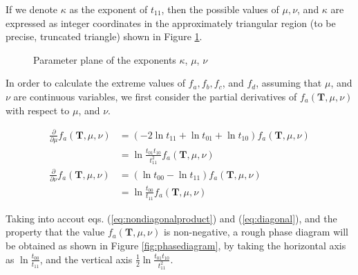 ﻿\documentclass[a4paper,xelatex,english]{bxjsarticle}
\newcommand\mib[1]{\boldsymbol{#1}}
\begin{document}
If we denote $\kappa$ as the exponent of $t_{11}$, then the possible values of $\mu, \nu$, and $\kappa$ are expressed as integer coordinates in the approximately triangular region (to be precise, truncated triangle) shown in Figure \ref{fig:parameterplane}.
\begin{figure}[htbp]
\centering


\caption{Parameter plane of the exponents $\kappa$, $\mu$, $\nu$}
\label{fig:parameterplane}
\end{figure}

In order to calculate the extreme values of $f_{a}, f_{b}, f_{c}$, and $f_{d}$, assuming that $\mu$, and $\nu$ are continuous variables, we first consider the partial derivatives of $f_{a}(\mib{T}, \mu, \nu)$ with respect to $\mu$, and $\nu$.

\begin{align}
	\frac{\partial }{\partial \mu} f_{a}(\mib{T}, \mu, \nu) 
	&= 
	(-2 \ln t_{11} + \ln t_{01} + \ln t_{10}) f_{a}(\mib{T}, \mu, \nu) 
	\nonumber \\
	&= 
	\ln \frac{t_{01} t_{10}}{t_{11}^{2}} 
	f_{a}(\mib{T}, \mu, \nu) 
	\label{eq:nondiagonalproduct}
	\\
	\frac{\partial }{\partial \nu} f_{a}(\mib{T}, \mu, \nu) 
	&= 
	(\ln t_{00} - \ln t_{11}) f_{a}(\mib{T}, \mu, \nu) 
	\nonumber \\
	&= 
	\ln \frac{t_{00}}{t_{11}} 
	f_{a}(\mib{T}, \mu, \nu) 
	\label{eq:diagonal}
\end{align}


Taking into accout eqs. (\ref{eq:nondiagonalproduct}) and (\ref{eq:diagonal}), and the property that the value $f_{a}(\mib{T}, \mu, \nu)$ is non-negative, 
a rough phase diagram will be obtained as shown in Figure \ref{fig:phasediagram}, by taking the horizontal axis as $\ln \frac{t_{00}}{t_{11}}$, and the vertical axis $\tfrac{1}{2}\ln \frac{t_{01} t_{10}}{t_{11}^{2}}$.
\end{document}
